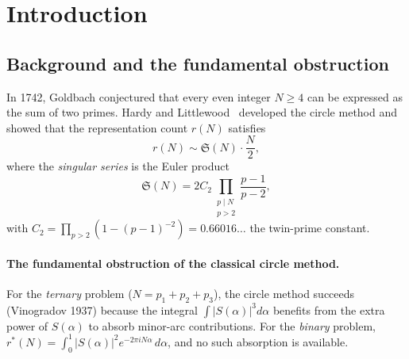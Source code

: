 \documentclass[11pt,a4paper]{article}
\theoremstyle{remark}
\begin{document}
\tableofcontents
\newpage

\section{Introduction}
\label{sec:intro}

\subsection{Background and the fundamental obstruction}

In 1742, Goldbach conjectured that every even integer $N \geq 4$ can be
expressed as the sum of two primes.  Hardy and
Littlewood~\cite{HL1923} developed the circle method and showed that
the representation count $r(N)$ satisfies
\begin{equation}
\label{eq:HL-asymptotic}
  r(N) \sim \mathfrak{S}(N) \cdot \frac{N}{2},
\end{equation}
where the \emph{singular series} is the Euler product
\begin{equation}
\label{eq:singular-series}
  \mathfrak{S}(N) = 2C_2 \prod_{\substack{p \mid N \\ p > 2}} \frac{p-1}{p-2},
\end{equation}
with $C_2 = \prod_{p>2}(1-(p-1)^{-2}) = 0.66016\ldots$ the twin-prime
constant.

\paragraph{The fundamental obstruction of the classical circle method.}
For the \emph{ternary} problem ($N = p_1 + p_2 + p_3$), the circle
method succeeds (Vinogradov 1937) because the integral
$\int |S(\alpha)|^3 d\alpha$ benefits from the extra power of $S(\alpha)$
to absorb minor-arc contributions.  For the \emph{binary} problem,
$r^*(N) = \int_0^1 |S(\alpha)|^2 e^{-2\pi i N\alpha}\,d\alpha$, and no
such absorption is available.
\end{document}
